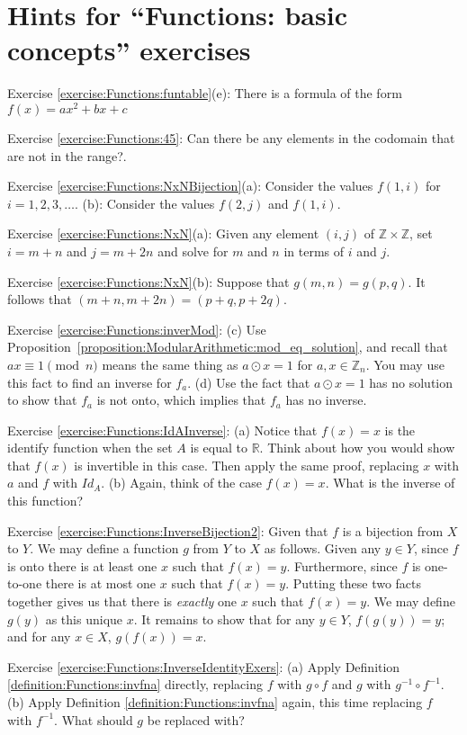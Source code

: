 \section{Hints for ``Functions: basic concepts'' exercises}
\label{sec:Functions:Hints}

\noindent Exercise \ref{exercise:Functions:funtable}(e): There is a formula of the form $f(x) = ax^2 + bx + c$

\noindent Exercise \ref{exercise:Functions:45}: Can there be any elements in the codomain that are not in the range?.

\noindent Exercise \ref{exercise:Functions:NxNBijection}(a): Consider the values $f(1,i)$  for $i=1,2,3,\ldots$. (b): Consider  the values $f(2,j)$ and $f(1,i)$.

\noindent Exercise \ref{exercise:Functions:NxN}(a): Given any element $(i,j)$ of $\mathbb{Z} \times \mathbb{Z}$, set $i=m+n$ and $j=m+2n$ and solve for $m$ and $n$ in terms of $i$ and $j$.

\noindent Exercise \ref{exercise:Functions:NxN}(b): Suppose that $g(m,n) = g(p,q)$. It follows that $(m + n, m + 2n) = (p + q, p + 2q)$. %

\noindent Exercise \ref{exercise:Functions:inverMod}: (c) 
Use Proposition~\ref{proposition:ModularArithmetic:mod_eq_solution}, and recall that $ax \equiv 1 \pmod{n}$ means the same thing as $a \odot x = 1$ for $a,x \in \mathbb{Z}_n$.  You may use this fact to find an inverse for $f_a$. (d) Use the fact that $a \odot x = 1$ has no solution to  show that $f_a$ is not onto, which implies that $f_a$ has no inverse.

\noindent Exercise \ref{exercise:Functions:IdAInverse}: (a) Notice that $f(x)=x$ is the identify function when the set $A$ is equal to $\mathbb{R}$.  Think about how you would show that $f(x)$ is invertible in this case.  Then apply the same proof, replacing $x$ with $a$ and $f$ with
$Id_A$.  (b) Again, think of the case $f(x)=x$.  What is the inverse of this function? 

\noindent Exercise \ref{exercise:Functions:InverseBijection2}: Given that $f$ is a bijection from $X$ to $Y$. We may define a function $g$ from $Y$ to $X$ as follows.  Given any $y \in Y$, since $f$ is onto there is at least one $x$ such that $f(x) = y$. Furthermore, since $f$ is one-to-one there is at most one $x$ such that $f(x)=y$. Putting these two facts together gives us that there is \emph{exactly} one $x$ such that $f(x)=y$.  We may define $g(y)$ as this unique $x$. It remains to show that for any $y \in Y$, $f(g(y))=y$; and for any $x \in X$, $g(f(x))=x$.

\noindent Exercise \ref{exercise:Functions:InverseIdentityExers}: (a) Apply Definition  \ref{definition:Functions:invfna} directly, replacing $f$ with
$g \circ f$ and $g$ with $g^{-1} \circ f^{-1}$. (b) Apply Definition  \ref{definition:Functions:invfna} again, this time replacing $f$ with
$f^{-1}$. What should $g$ be replaced with?

